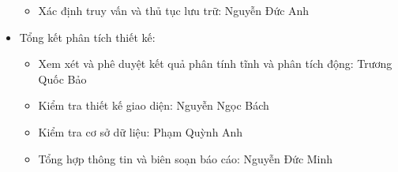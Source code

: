 \documentclass[12pt]{article}
\begin{document}
\begin{itemize}[label=-, leftmargin=1cm]
\begin{itemize}[label=+, leftmargin=1cm]
        \item Xác định truy vấn và thủ tục lưu trữ: Nguyễn Đức Anh
    \end{itemize}
    \item Tổng kết phân tích thiết kế:
    \begin{itemize}[label=+, leftmargin=1cm]
        \item Xem xét và phê duyệt kết quả phân tính tĩnh và phân tích động: Trương Quốc Bảo
        \item Kiểm tra thiết kế giao diện: Nguyễn Ngọc Bách
        \item Kiểm tra cơ sở dữ liệu: Phạm Quỳnh Anh
        \item Tổng hợp thông tin và biên soạn báo cáo: Nguyễn Đức Minh
    \end{itemize}
\end{itemize}
\end{document}
